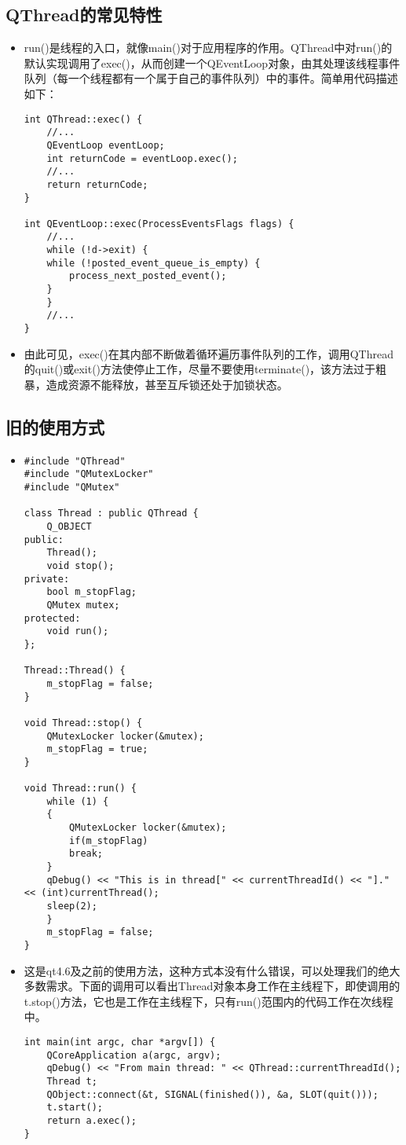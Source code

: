 \documentclass[9pt,b5paper]{article}
\begin{document}
\subsection{QThread的常见特性}
\label{sec-5-1}
\begin{itemize}
\item run()是线程的入口，就像main()对于应用程序的作用。QThread中对run()的默认实现调用了exec()，从而创建一个QEventLoop对象，由其处理该线程事件队列（每一个线程都有一个属于自己的事件队列）中的事件。简单用代码描述如下：
\lstset{language=java,label= ,caption= ,numbers=none}
\begin{lstlisting}
int QThread::exec() {
    //...
    QEventLoop eventLoop;
    int returnCode = eventLoop.exec();
    //...
    return returnCode;
}

int QEventLoop::exec(ProcessEventsFlags flags) {
    //...
    while (!d->exit) {
	while (!posted_event_queue_is_empty) {
	    process_next_posted_event();
	}
    }
    //...
}
\end{lstlisting}
\item 由此可见，exec()在其内部不断做着循环遍历事件队列的工作，调用QThread的quit()或exit()方法使停止工作，尽量不要使用terminate()，该方法过于粗暴，造成资源不能释放，甚至互斥锁还处于加锁状态。
\end{itemize}
\subsection{旧的使用方式}
\label{sec-5-2}
\begin{itemize}
\item \lstset{language=java,label= ,caption= ,numbers=none}
\begin{lstlisting}
#include "QThread"
#include "QMutexLocker"
#include "QMutex"

class Thread : public QThread {
    Q_OBJECT
public:
    Thread();
    void stop();
private:
    bool m_stopFlag;
    QMutex mutex;
protected:
    void run();
};

Thread::Thread() {
    m_stopFlag = false;
}

void Thread::stop() {
    QMutexLocker locker(&mutex);
    m_stopFlag = true;
}

void Thread::run() {
    while (1) {
	{
	    QMutexLocker locker(&mutex);
	    if(m_stopFlag)
		break;
	}
	qDebug() << "This is in thread[" << currentThreadId() << "]." << (int)currentThread();
	sleep(2);
    }
    m_stopFlag = false;
}
\end{lstlisting}
\item 这是qt4.6及之前的使用方法，这种方式本没有什么错误，可以处理我们的绝大多数需求。下面的调用可以看出Thread对象本身工作在主线程下，即使调用的t.stop()方法，它也是工作在主线程下，只有run()范围内的代码工作在次线程中。

\lstset{language=java,label= ,caption= ,numbers=none}
\begin{lstlisting}
int main(int argc, char *argv[]) {
    QCoreApplication a(argc, argv);
    qDebug() << "From main thread: " << QThread::currentThreadId();
    Thread t;
    QObject::connect(&t, SIGNAL(finished()), &a, SLOT(quit()));
    t.start();
    return a.exec();
}
\end{lstlisting}
\end{itemize}
\end{document}
